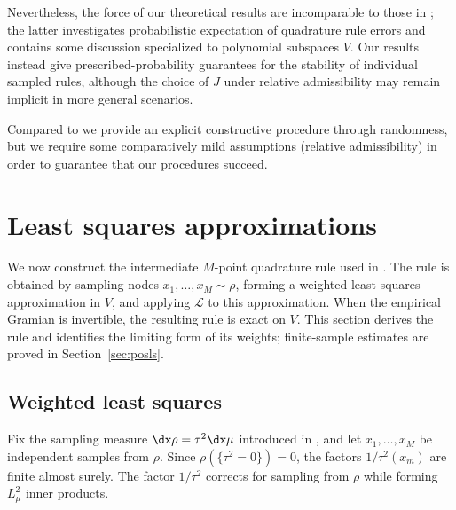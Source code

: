 \documentclass[10pt,dvipsnames]{amsart}
\begin{document}
Nevertheless, the force of our theoretical results
are incomparable to those in \cite{migliorati2022stable}; the latter
investigates probabilistic expectation of quadrature rule errors and contains
some discussion specialized to polynomial subspaces $V$. Our results instead
give prescribed-probability guarantees for the stability of individual sampled
rules, although the choice of \(J\) under relative admissibility may remain
implicit in more general scenarios.

Compared to \cite{schafer_2025} we provide an explicit constructive
procedure through randomness, but we require some comparatively mild
assumptions (relative admissibility) in order to guarantee that our procedures
succeed.


\section{Least squares approximations}
\label{sec:ls}

We now construct the intermediate \(M\)-point quadrature rule used in
.  The rule is obtained by sampling
nodes \(x_1,\ldots,x_M\sim\rho\), forming a weighted least squares
approximation in \(V\), and applying \(\mathcal L\) to this approximation.
When the empirical Gramian is invertible, the resulting rule is exact on
\(V\).  This section derives the rule and identifies the limiting form of
its weights; finite-sample estimates are proved in
Section~\ref{sec:posls}.

\subsection{Weighted least squares}
Fix the sampling measure \(\dx\rho=\tau^2\dx\mu\) introduced in
, and let
\(x_1,\ldots,x_M\) be independent samples from \(\rho\). Since
\(\rho(\{\tau^2=0\})=0\), the factors \(1/\tau^2(x_m)\) are finite almost
surely. The factor \(1/\tau^2\) corrects for sampling from \(\rho\) while forming
\(L^2_\mu\) inner products.
\end{document}
